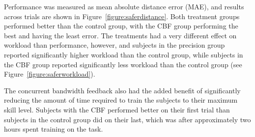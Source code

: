 Performance was measured as mean absolute distance error (MAE), and results across trials are shown in Figure~\ref{figure:saferdistance}.
Both treatment groups performed better than the control group, with the CBF group performing the best and having the least error.
The treatments had a very different effect on workload than performance, however, and subjects in the precision group reported significantly higher workload than the control group, while subjects in the CBF group reported significantly less workload than the control group (see Figure~\ref{figure:saferworkload}).

The concurrent bandwidth feedback also had the added benefit of significantly reducing the amount of time required to train the subjects to their maximum skill level.
Subjects with the CBF performed better on their first trial than subjects in the control group did on their last, which was after approximately two hours spent training on the task.

